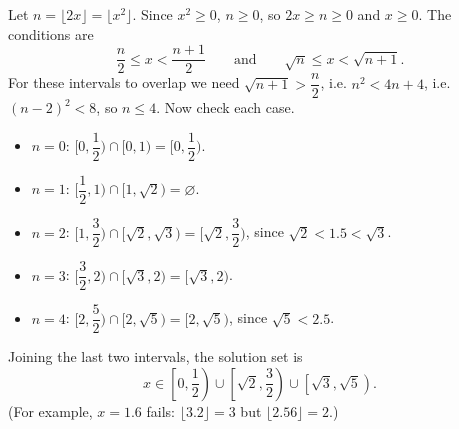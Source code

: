Let $n=\lfloor 2x\rfloor=\lfloor x^2\rfloor$. Since $x^2\ge0$, $n\ge0$, so $2x\ge n\ge 0$ and $x\ge0$. The conditions are
\[
\dfrac {n}{2}\le x<\dfrac{n+1}{2}\qquad\text{and}\qquad \sqrt n\le x<\sqrt{n+1}.
\]
For these intervals to overlap we need $\sqrt{n+1}>\dfrac {n}{2}$, i.e. $n^2<4n+4$, i.e. $(n-2)^2<8$, so $n\le4$. Now check each case.
\begin{itemize}
\item $n=0$: $[0,\dfrac{1}{2})\cap[0,1)=[0,\dfrac{1}{2})$.
\item $n=1$: $[\dfrac{1}{2},1)\cap[1,\sqrt2)=\varnothing$.
\item $n=2$: $[1,\dfrac{3}{2})\cap[\sqrt2,\sqrt3)=[\sqrt2,\dfrac{3}{2})$, since $\sqrt2<1.5<\sqrt3$.
\item $n=3$: $[\dfrac{3}{2},2)\cap[\sqrt3,2)=[\sqrt3,2)$.
\item $n=4$: $[2,\dfrac{5}{2})\cap[2,\sqrt5)=[2,\sqrt5)$, since $\sqrt5<2.5$.
\end{itemize}
Joining the last two intervals, the solution set is
\[
\boxed{x\in\left[0,\dfrac{1}{2}\right)\cup\left[\sqrt2,\dfrac{3}{2}\right)\cup\left[\sqrt3,\sqrt5\right)} .
\]
(For example, $x=1.6$ fails: $\lfloor3.2\rfloor=3$ but $\lfloor2.56\rfloor=2$.)
